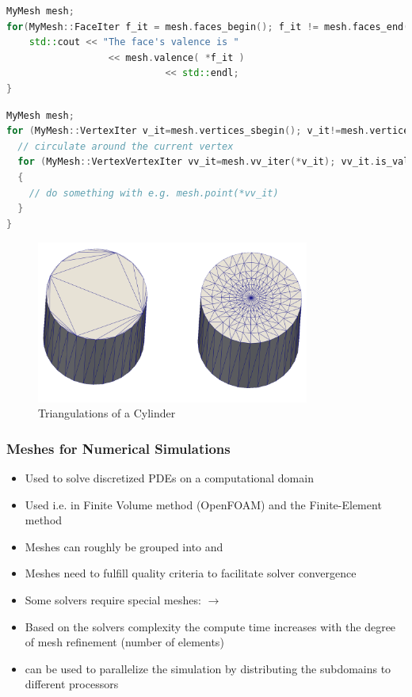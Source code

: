 \begin{frame}[fragile]

    \begin{lstlisting}[language=C++]
MyMesh mesh;
for(MyMesh::FaceIter f_it = mesh.faces_begin(); f_it != mesh.faces_end(); ++f_it) {
    std::cout << "The face's valence is " 
		          << mesh.valence( *f_it ) 
							<< std::endl;
}\end{lstlisting}     

\begin{lstlisting}[language=C++]
MyMesh mesh;
for (MyMesh::VertexIter v_it=mesh.vertices_sbegin(); v_it!=mesh.vertices_end(); ++v_it) {
  // circulate around the current vertex
  for (MyMesh::VertexVertexIter vv_it=mesh.vv_iter(*v_it); vv_it.is_valid(); ++vv_it)
  {
    // do something with e.g. mesh.point(*vv_it)
  }
}\end{lstlisting}     
\end{frame}

\begin{frame}
\begin{figure}[h!]
 \includegraphics[width=0.8\textwidth]{screenshots/tria-quality.png}
\caption{Triangulations of a Cylinder}
\end{figure}
\end{frame}

\begin{frame}
\frametitle{Meshes for Numerical Simulations}
\begin{itemize}
\item Used to solve discretized PDEs on a computational domain
\item Used i.e. in Finite Volume method (OpenFOAM) and the Finite-Element method
\item Meshes can roughly be grouped into  and 
\item Meshes need to fulfill quality criteria to facilitate solver convergence
\item Some solvers require special meshes:  $\rightarrow$ 
\item Based on the solvers complexity the compute time increases with the degree of mesh refinement (number of elements)
\item {} can be used to parallelize the simulation by distributing the subdomains to different processors
\end{itemize}
\end{frame}

